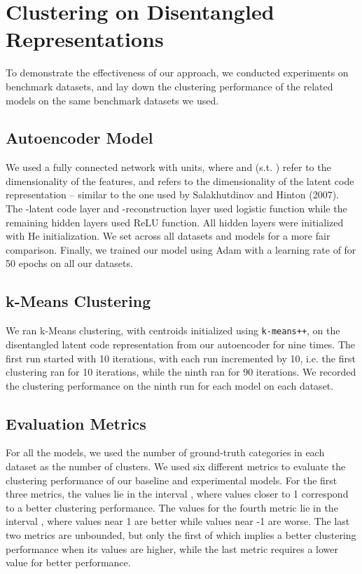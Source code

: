 \documentclass[conference]{IEEEtran}
\begin{document}
\section{Clustering on Disentangled Representations}\label{section:clustering_disentangled_representations}
To demonstrate the effectiveness of our approach, we conducted experiments on benchmark datasets, and lay down the clustering performance of the related models on the same benchmark datasets we used.

\subsection{Autoencoder Model}
We used a fully connected network with  units, where  and  (s.t. ) refer to the dimensionality of the features, and  refers to the dimensionality of the latent code representation -- similar to the one used by Salakhutdinov and Hinton (2007)\cite{salakhutdinov2007learning}. The -latent code layer and -reconstruction layer used logistic function while the remaining hidden layers used ReLU function\cite{nair2010rectified}. All hidden layers were initialized with He initialization\cite{he2015delving}. We set  across all datasets and models for a more fair comparison. Finally, we trained our model using Adam\cite{kingma2014adam} with a learning rate of  for 50 epochs on all our datasets.

\subsection{k-Means Clustering}
We ran k-Means clustering, with centroids initialized using \texttt{k-means++}\cite{arthur2007kmeans}, on the disentangled latent code representation from our autoencoder for nine times. The first run started with 10 iterations, with each run incremented by 10, i.e. the first clustering ran for 10 iterations, while the ninth ran for 90 iterations. We recorded the clustering performance on the ninth run for each model on each dataset.

\subsection{Evaluation Metrics}
For all the models, we used the number of ground-truth categories in each dataset as the number of clusters. We used six different metrics to evaluate the clustering performance of our baseline and experimental models. For the first three metrics, the values lie in the interval , where values closer to 1 correspond to a better clustering performance. The values for the fourth metric lie in the interval , where values near 1 are better while values near -1 are worse. The last two metrics are unbounded, but only the first of which implies a better clustering performance when its values are higher, while the last metric requires a lower value for better performance.
\end{document}
